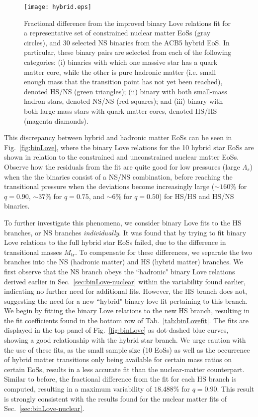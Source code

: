 \documentclass[prd,twocolumn,nofootinbib,superscriptaddress,amsmath,amssymb]{revtex4-1}
\begin{document}
\begin{figure}
\begin{center} 
\texttt{[image: hybrid.eps]}
\end{center}
\caption{
Fractional difference from the improved binary Love relations fit for a representative set of constrained nuclear matter EoSs (gray circles), and 30 selected NS binaries from the ACB5 hybrid EoS.
In particular, these binary pairs are selected from each of the following categories: (i) binaries with which one massive star has a quark matter core, while the other is pure hadronic matter (i.e. small enough mass that the transition point has not yet been reached), denoted HS/NS (green triangles); (ii) binary with both small-mass hadron stars, denoted NS/NS (red squares); and (iii) binary with both large-mass stars with quark matter cores, denoted HS/HS (magenta diamonds).
}
\label{fig:hybrid}
\end{figure} 

This discrepancy between hybrid and hadronic matter EoSs can be seen in Fig.~\ref{fig:binLove}, where the binary Love relations for the 10 hybrid star EoSs are shown in relation to the constrained and unconstrained nuclear matter EoSs.
Observe how the residuals from the fit are quite good for low pressures (large $\Lambda_s$) when the the binaries consist of a NS/NS combination, before reaching the transitional pressure when the deviations become increasingly large ($\sim160$\% for $q=0.90$, $\sim37$\% for $q=0.75$, and $\sim6$\% for $q=0.50$) for HS/HS and HS/NS binaries. {}

To further investigate this phenomena, we consider binary Love fits to the HS branches, or NS branches \emph{individually}.
It was found that by trying to fit binary Love relations to the full hybrid star EoSs failed, due to the difference in transitional masses $M_{\text{tr}}$.
To compensate for these differences, we separate the two branches into the NS (hadronic matter) and HS (hybrid matter) branches.
We first observe that the NS branch obeys the ``hadronic" binary Love relations derived earlier in Sec.~\ref{sec:binLove-nuclear} within the variability found earlier, indicating no further need for additional fits.
However, the HS branch does not, suggesting the need for a new ``hybrid" binary love fit pertaining to this branch.
We begin by fitting the binary Love relations to the new HS branch, resulting in the fit coefficients found in the bottom row of Tab.~\ref{tab:binLovefit}.
The fits are displayed in the top panel of Fig.~\ref{fig:binLove} as dot-dashed blue curves, showing a good relationship with the hybrid star branch.
We urge caution with the use of these fits, as the small sample size (10 EoSs) as well as the occurrence of hybrid matter transitions only being available for certain mass ratios on certain EoSs, results in a less accurate fit than the nuclear-matter counterpart.
Similar to before, the fractional difference from the fit for each HS branch is computed, resulting in a maximum variability of $18.488$\% for $q=0.90$.
This result is strongly consistent with the results found for the nuclear matter fits of Sec.~\ref{sec:binLove-nuclear}.
\end{document}
